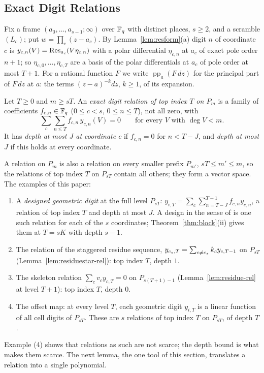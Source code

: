 \subsection{Exact Digit Relations}\label{sec:countdef}
Fix a frame $(a_0,\dots,a_{s-1};\infty)$ over $\mathbb{F}_q$ with distinct places, $s\ge2$, and a scramble $(L_c)$; put $w=\prod_c(z-a_c)$. By Lemma~\ref{lem:resform}(a) digit $n$ of coordinate $c$ is $y_{c,n}(V)=\operatorname{Res}_{a_c}(V\eta_{c,n})$ with a polar differential $\eta_{c,n}$ at $a_c$ of exact pole order $n+1$; so $\eta_{c,0},\dots,\eta_{c,T}$ are a basis of the polar differentials at $a_c$ of pole order at most $T+1$. For a rational function $F$ we write $\operatorname{pp}_a(F\,dz)$ for the principal part of $F\,dz$ at $a$: the terms $(z-a)^{-k}dz$, $k\ge1$, of its expansion.

\begin{definition}\label{def:exactrel}
Let $T\ge0$ and $m\ge sT$. An \emph{exact digit relation of top index $T$ on $P_m$} is a family of coefficients $f_{c,n}\in\mathbb{F}_q$ ($0\le c<s$, $0\le n\le T$), not all zero, with
\[
\sum_c\sum_{n\le T}f_{c,n}\,y_{c,n}(V)=0\qquad\text{for every }V\text{ with }\deg V<m .
\]
It has \emph{depth at most $J$ at coordinate $c$} if $f_{c,n}=0$ for $n<T-J$, and \emph{depth at most $J$} if this holds at every coordinate.
\end{definition}

A relation on $P_m$ is also a relation on every smaller prefix $P_{m'}$, $sT\le m'\le m$, so the relations of top index $T$ on $P_{sT}$ contain all others; they form a vector space. The examples of this paper:
\begin{enumerate}
\item[(1)] A \emph{designed geometric digit} at the full level $P_{sT}$: $y_{i,T}=\sum_c\sum_{n=T-J}^{T-1}f_{c,n}y_{c,n}$, a relation of top index $T$ and depth at most $J$. A design in the sense of \cite{Gru26geo} is one such relation for each of the $s$ coordinates; Theorem~\ref{thm:block}(ii) gives them at $T=sK$ with depth $s-1$.
\item[(2)] The relation of the staggered residue sequence, $y_{c_{\star},T}=\sum_{c\ne c_{\star}}k_cy_{c,T-1}$ on $P_{sT}$ (Lemma~\ref{lem:residuestar-rel}): top index $T$, depth $1$.
\item[(3)] The skeleton relation $\sum_cv_cy_{c,T}=0$ on $P_{s(T+1)-1}$ (Lemma~\ref{lem:residue-rel} at level $T+1$): top index $T$, depth $0$.
\item[(4)] The offset map: at every level $T$, each geometric digit $y_{i,T}$ is a linear function of all cell digits of $P_{sT}$. These are $s$ relations of top index $T$ on $P_{sT}$, of depth $T$.
\end{enumerate}
Example (4) shows that relations as such are not scarce; the depth bound is what makes them scarce. The next lemma, the one tool of this section, translates a relation into a single polynomial.

